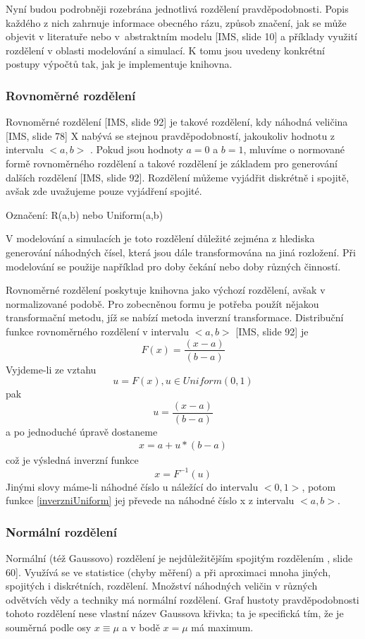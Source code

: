 \documentclass[a4paper,11pt]{article}
\begin{document}
Nyní budou podrobněji rozebrána jednotlivá rozdělení pravděpodobnosti. Popis každého z nich zahrnuje informace obecného rázu, způsob značení, jak se může objevit v literatuře nebo v abstraktním modelu [IMS, slide 10] a příklady využití rozdělení v oblasti modelování a simulací. K tomu jsou uvedeny konkrétní postupy výpočtů tak, jak je implementuje knihovna. 

\subsubsection{Rovnoměrné rozdělení}
Rovnoměrné rozdělení [IMS, slide 92] je takové rozdělení, kdy náhodná veličina [IMS, slide 78] X nabývá se stejnou pravděpodobností, jakoukoliv hodnotu z intervalu $<a, b>$ \cite{INM}. Pokud jsou hodnoty $a = 0$ a $b = 1$, mluvíme o normované formě rovnoměrného rozdělení a takové rozdělení je základem pro generování dalších rozdělení [IMS, slide 92]. Rozdělení můžeme vyjádřit diskrétně i spojitě, avšak zde uvažujeme pouze vyjádření spojité.

Označení: R(a,b) nebo Uniform(a,b)

V modelování a simulacích je toto rozdělení důležité zejména z hlediska generování náhodných čísel, která jsou dále transformována na jiná rozložení. Při modelování se použije například pro doby čekání nebo doby různých činností.

Rovnoměrné rozdělení poskytuje knihovna jako výchozí rozdělení, avšak v normalizované podobě. Pro zobecněnou formu je potřeba použít nějakou transformační metodu, jíž se nabízí metoda inverzní transformace. Distribuční funkce rovnoměrného rozdělení v intervalu $<a, b>$ [IMS, slide 92] je $$F(x) = \frac{(x-a)}{(b-a)}$$ Vyjdeme-li ze vztahu $$u = F(x), u \in Uniform(0, 1)$$pak $$u = \frac{(x-a)}{(b-a)}$$ a po jednoduché úpravě dostaneme 
\begin{eqnarray}\label{inverzniUniform}
x = a + u * (b-a)
\end{eqnarray}
což je výsledná inverzní funkce $$x=F^{-1}(u)$$ Jinými slovy máme-li náhodné číslo u náležící do intervalu $<0, 1>$, potom funkce \ref{inverzniUniform} jej převede na náhodné číslo x z intervalu $<a, b>$.

\subsubsection{Normální rozdělení}

Normální (též Gaussovo) rozdělení je nejdůležitějším spojitým rozdělením \cite{INM}, slide 60]. Využívá se ve statistice (chyby měření) a při aproximaci mnoha jiných, spojitých i diskrétních, rozdělení. Množství náhodných veličin v různých odvětvích vědy a techniky má normální rozdělení. Graf hustoty pravděpodobnosti tohoto rozdělení nese vlastní název Gaussova křivka; ta je specifická tím, že je souměrná podle osy $x \equiv \mu$ a v bodě $x = \mu$ má maximum.
\end{document}
